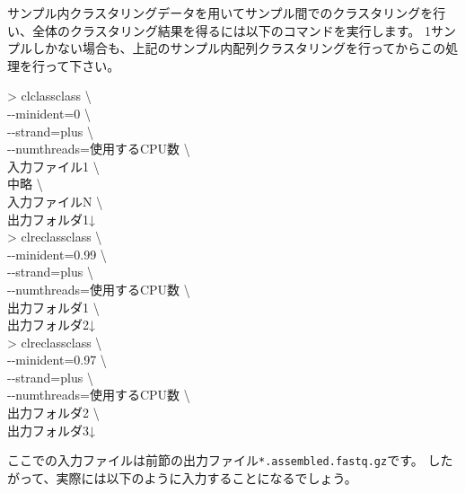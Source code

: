 \documentclass[titlepage,10pt,a4paper]{jsbook}
\newenvironment{cmd}{\begin{oframed}\raggedright\ttfamily\footnotesize\setlength{\baselineskip}{1.4em}}{\end{oframed}\vspace{-1em}}
\begin{document}
サンプル内クラスタリングデータを用いてサンプル間でのクラスタリングを行い、全体のクラスタリング結果を得るには以下のコマンドを実行します。
1サンプルしかない場合も、上記のサンプル内配列クラスタリングを行ってからこの処理を行って下さい。
\begin{cmd}
{\textgreater} clclassclass {\textbackslash}\\
{-}{-}minident=0 {\textbackslash}\\
{-}{-}strand=plus {\textbackslash}\\
{-}{-}numthreads=使用するCPU数 {\textbackslash}\\
入力ファイル1 {\textbackslash}\\
中略 {\textbackslash}\\
入力ファイルN {\textbackslash}\\
出力フォルダ1↓\\
{\textgreater} clreclassclass {\textbackslash}\\
{-}{-}minident=0.99 {\textbackslash}\\
{-}{-}strand=plus {\textbackslash}\\
{-}{-}numthreads=使用するCPU数 {\textbackslash}\\
出力フォルダ1 {\textbackslash}\\
出力フォルダ2↓\\
{\textgreater} clreclassclass {\textbackslash}\\
{-}{-}minident=0.97 {\textbackslash}\\
{-}{-}strand=plus {\textbackslash}\\
{-}{-}numthreads=使用するCPU数 {\textbackslash}\\
出力フォルダ2 {\textbackslash}\\
出力フォルダ3↓
\end{cmd}
ここでの入力ファイルは前節の出力ファイル\texttt{*.assembled.fastq.gz}です。
したがって、実際には以下のように入力することになるでしょう。
\end{document}
